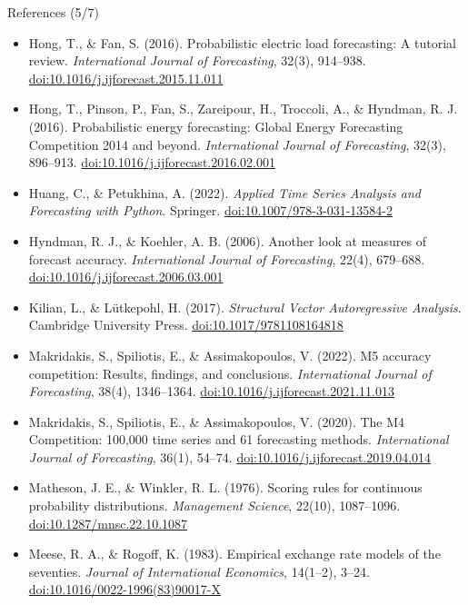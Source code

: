 \begin{frame}{References (5/7)}
\itemsize{\tiny}
\begin{itemize}
    \item Hong, T., \& Fan, S. (2016). Probabilistic electric load forecasting: A tutorial review. \textit{International Journal of Forecasting}, 32(3), 914--938. \href{https://doi.org/10.1016/j.ijforecast.2015.11.011}{doi:10.1016/j.ijforecast.2015.11.011}
    \item Hong, T., Pinson, P., Fan, S., Zareipour, H., Troccoli, A., \& Hyndman, R. J. (2016). Probabilistic energy forecasting: Global Energy Forecasting Competition 2014 and beyond. \textit{International Journal of Forecasting}, 32(3), 896--913. \href{https://doi.org/10.1016/j.ijforecast.2016.02.001}{doi:10.1016/j.ijforecast.2016.02.001}
    \item Huang, C., \& Petukhina, A. (2022). \textit{Applied Time Series Analysis and Forecasting with Python}. Springer. \href{https://doi.org/10.1007/978-3-031-13584-2}{doi:10.1007/978-3-031-13584-2}
    \item Hyndman, R. J., \& Koehler, A. B. (2006). Another look at measures of forecast accuracy. \textit{International Journal of Forecasting}, 22(4), 679--688. \href{https://doi.org/10.1016/j.ijforecast.2006.03.001}{doi:10.1016/j.ijforecast.2006.03.001}
    \item Kilian, L., \& Lütkepohl, H. (2017). \textit{Structural Vector Autoregressive Analysis}. Cambridge University Press. \href{https://doi.org/10.1017/9781108164818}{doi:10.1017/9781108164818}
    \item Makridakis, S., Spiliotis, E., \& Assimakopoulos, V. (2022). M5 accuracy competition: Results, findings, and conclusions. \textit{International Journal of Forecasting}, 38(4), 1346--1364. \href{https://doi.org/10.1016/j.ijforecast.2021.11.013}{doi:10.1016/j.ijforecast.2021.11.013}
    \item Makridakis, S., Spiliotis, E., \& Assimakopoulos, V. (2020). The M4 Competition: 100,000 time series and 61 forecasting methods. \textit{International Journal of Forecasting}, 36(1), 54--74. \href{https://doi.org/10.1016/j.ijforecast.2019.04.014}{doi:10.1016/j.ijforecast.2019.04.014}
    \item Matheson, J. E., \& Winkler, R. L. (1976). Scoring rules for continuous probability distributions. \textit{Management Science}, 22(10), 1087--1096. \href{https://doi.org/10.1287/mnsc.22.10.1087}{doi:10.1287/mnsc.22.10.1087}
    \item Meese, R. A., \& Rogoff, K. (1983). Empirical exchange rate models of the seventies. \textit{Journal of International Economics}, 14(1--2), 3--24. \href{https://doi.org/10.1016/0022-1996(83)90017-X}{doi:10.1016/0022-1996(83)90017-X}

\end{itemize}
\end{frame}

